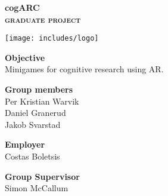 
\clearpage
\renewcommand{\headrulewidth}{0pt}
\thispagestyle{fancy}

\begin{center}
\Huge\bfseries cogARC\\
\large\bfseries\scshape graduate project
\end{center}

\vfill

\begin{center}
\texttt{[image: includes/logo]}
\end{center}

\vfill

\begin{center}
\textbf{Objective}\\
Minigames for cognitive research using AR.
\end{center}

\vfill

\begin{minipage}[t]{0.5\linewidth}
\textbf{Group members}\\
Per Kristian Warvik\\
Daniel Granerud\\
Jakob Svarstad\\
\end{minipage}
\begin{minipage}[t]{0.5\linewidth}
\end{minipage}

\vfill

\begin{minipage}[t]{0.5\linewidth}
\textbf{Employer}\\
Costas Boletsis
\end{minipage}
\begin{minipage}[t]{0.5\linewidth}
\begin{flushright}
\textbf{Group Supervisor}\\
Simon McCallum
\end{flushright}
\end{minipage}

\vfill



